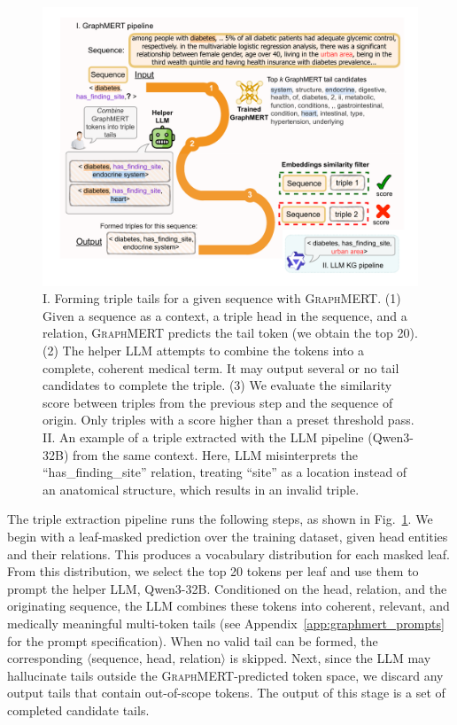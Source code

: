 \documentclass[10pt]{article}
\newcommand{\ours}{\textsc{GraphMERT}\xspace}
\begin{document}
\begin{figure}[t]
\centering
\includegraphics[width=\linewidth]{pictures/triple_formation.pdf}
\caption{I. Forming triple tails for a given sequence with \ours. (1) Given a sequence as a context, a triple head in the sequence, and a relation, \ours predicts the tail token (we obtain the top 20). (2) The helper LLM attempts to combine the tokens into a complete, coherent medical term. It may output several or no tail candidates to complete the triple. (3) We evaluate the similarity score between triples from the previous step and the sequence of origin. Only triples with a score higher than a preset threshold pass.\\
II. An example of a triple extracted with the LLM pipeline (Qwen3-32B) from the same context. Here, LLM misinterprets the ``has\_finding\_site'' relation, treating ``site'' as a location instead of an anatomical structure, which results in an invalid triple.}
\label{fig:triple_formation}
\end{figure}

The triple extraction pipeline runs the following steps, as shown in Fig.~\ref{fig:triple_formation}. We begin with a leaf-masked prediction over the training dataset, given head entities and their relations. This produces a vocabulary distribution for each masked leaf. From this distribution, we select the top 20 tokens per leaf and use them to prompt the helper LLM, Qwen3-32B. Conditioned on the head, relation, and the originating sequence, the LLM combines these tokens into coherent, relevant, and medically meaningful multi-token tails (see Appendix~\ref{app:graphmert_prompts} for the prompt specification). When no valid tail can be formed, the corresponding $\langle$sequence, head, relation$\rangle$ is skipped. Next, since the LLM may hallucinate tails outside the \ours-predicted token space, we discard any output tails that contain out-of-scope tokens. The output of this stage is a set of completed candidate tails.
\end{document}
